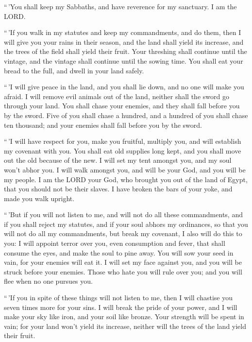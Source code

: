 ``\,'You shall keep my Sabbaths, and have reverence for
my sanctuary. I am the LORD.

 ``\,'If you walk in my statutes and keep my commandments,
and do them,  then I will give you your rains in their
season, and the land shall yield its increase, and the trees of the
field shall yield their fruit.  Your threshing shall
continue until the vintage, and the vintage shall continue until the
sowing time. You shall eat your bread to the full, and dwell in your
land safely.

 ``\,'I will give peace in the land, and you shall lie
down, and no one will make you afraid. I will remove evil animals out of
the land, neither shall the sword go through your land. 
You shall chase your enemies, and they shall fall before you by the
sword.  Five of you shall chase a hundred, and a hundred
of you shall chase ten thousand; and your enemies shall fall before you
by the sword.

 ``\,'I will have respect for you, make you fruitful,
multiply you, and will establish my covenant with you. 
You shall eat old supplies long kept, and you shall move out the old
because of the new.  I will set my tent amongst you, and
my soul won't abhor you.  I will walk amongst you, and
will be your God, and you will be my people.  I am the
LORD your God, who brought you out of the land of Egypt, that you should
not be their slaves. I have broken the bars of your yoke, and made you
walk upright.

 ``\,'But if you will not listen to me, and will not do
all these commandments,  and if you shall reject my
statutes, and if your soul abhors my ordinances, so that you will not do
all my commandments, but break my covenant,  I also will
do this to you: I will appoint terror over you, even consumption and
fever, that shall consume the eyes, and make the soul to pine away. You
will sow your seed in vain, for your enemies will eat it.
 I will set my face against you, and you will be struck
before your enemies. Those who hate you will rule over you; and you will
flee when no one pursues you.

 ``\,'If you in spite of these things will not listen to
me, then I will chastise you seven times more for your sins.
 I will break the pride of your power, and I will make
your sky like iron, and your soil like bronze.  Your
strength will be spent in vain; for your land won't yield its increase,
neither will the trees of the land yield their fruit.

